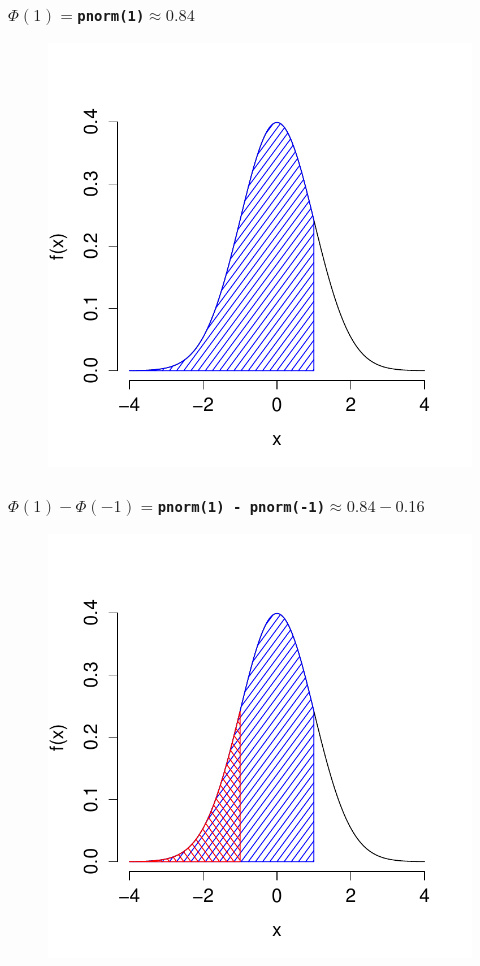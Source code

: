 \documentclass[handout]{beamer}
\begin{document}
\begin{frame}
\frametitle{$\Phi(1) =$\texttt{pnorm(1)}$\approx 0.84$}

\begin{figure}
\includegraphics[scale = 0.65]{./images/middle68_1}
\end{figure}
\end{frame}
\begin{frame}
\frametitle{$\Phi(1) - \Phi(-1) =$\texttt{pnorm(1) - pnorm(-1)}$\approx 0.84 - 0.16$}
\begin{figure}
\includegraphics[scale = 0.65]{./images/middle68_2}
\end{figure}
\end{frame}
\end{document}

